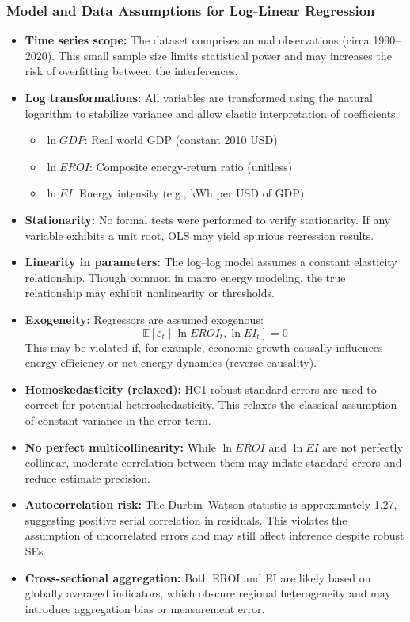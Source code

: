 \documentclass[a4paper,12pt]{article}
\begin{document}
\subsubsection{Model and Data Assumptions for Log-Linear Regression}
\begin{itemize}
    \item \textbf{Time series scope:} The dataset comprises annual observations (circa 1990–2020). This small sample size limits statistical power and may increases the risk of overfitting between the interferences.

    \item \textbf{Log transformations:} All variables are transformed using the natural logarithm to stabilize variance and allow elastic interpretation of coefficients:
    \begin{itemize}
        \item $\ln GDP$: Real world GDP (constant 2010 USD)
        \item $\ln EROI$: Composite energy-return ratio (unitless)
        \item $\ln EI$: Energy intensity (e.g., kWh per USD of GDP)
    \end{itemize}

    \item \textbf{Stationarity:} No formal tests were performed to verify stationarity. If any variable exhibits a unit root, OLS may yield spurious regression results.

    \item \textbf{Linearity in parameters:} The log–log model assumes a constant elasticity relationship. Though common in macro energy modeling, the true relationship may exhibit nonlinearity or thresholds.

    \item \textbf{Exogeneity:} Regressors are assumed exogenous:
    \[
    \mathbb{E}[\varepsilon_t \mid \ln EROI_t, \ln EI_t] = 0
    \]
    This may be violated if, for example, economic growth causally influences energy efficiency or net energy dynamics (reverse causality).

    \item \textbf{Homoskedasticity (relaxed):} HC1 robust standard errors are used to correct for potential heteroskedasticity. This relaxes the classical assumption of constant variance in the error term.

    \item \textbf{No perfect multicollinearity:} While $\ln EROI$ and $\ln EI$ are not perfectly collinear, moderate correlation between them may inflate standard errors and reduce estimate precision.

    \item \textbf{Autocorrelation risk:} The Durbin–Watson statistic is approximately 1.27, suggesting positive serial correlation in residuals. This violates the assumption of uncorrelated errors and may still affect inference despite robust SEs.

    \item \textbf{Cross-sectional aggregation:} Both EROI and EI are likely based on globally averaged indicators, which obscure regional heterogeneity and may introduce aggregation bias or measurement error.
\end{itemize}
\end{document}
